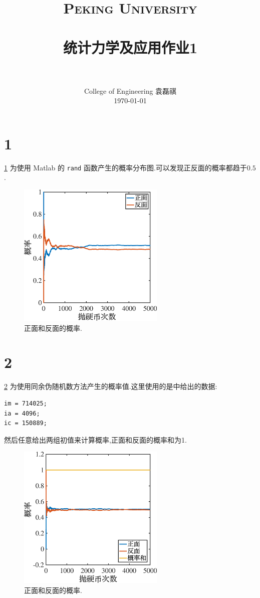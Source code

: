 \documentclass[12pt]{article}
\title{
		\vspace{-1in} 	
		\usefont{OT1}{bch}{b}{n}
		\normalfont \normalsize \textsc{\LARGE Peking University}\\[1cm] %
		\horrule{0.5pt} \\[0.5cm]
		\huge \bfseries{统计力学及应用作业1} \\
		\horrule{2pt} \\[0.5cm]
}
\author{
		\normalfont 								\normalsize
		College of Engineering \quad 2001111690  \quad 袁磊祺\\	\normalsize
        \today
}
\date{}
\begin{document}


\maketitle

\section{1}

\cref{fig:1} 为使用 Matlab 的 \texttt{rand} 函数产生的概率分布图.可以发现正反面的概率都趋于$0.5$.

\begin{figure}[htp]
	\centering
	\includegraphics[width=7cm]{posi1.eps}
	\caption{正面和反面的概率.}
	\label{fig:1}
\end{figure}


\section{2}

\cref{fig:2} 为使用同余伪随机数方法产生的概率值.这里使用的是\cite{10.5555/42249}中给出的数据:

\lstset{language=Matlab}
\begin{lstlisting}
im = 714025;
ia = 4096;
ic = 150889;
\end{lstlisting}

然后任意给出两组初值来计算概率,正面和反面的概率和为1.

\begin{figure}[htp]
	\centering
	\includegraphics[width=7cm]{posi2.eps}
	\caption{正面和反面的概率.}
	\label{fig:2}
\end{figure}
\end{document}
